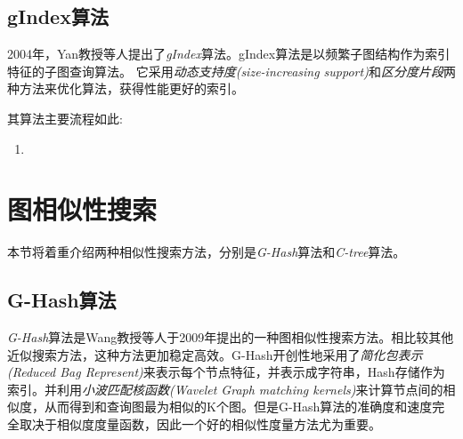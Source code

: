 \documentclass{XDBAthesis}
\begin{document}
\subsection{gIndex算法}
2004年，Yan教授等人提出了\emph{gIndex}算法\cite{gIndex}。gIndex算法是以频繁子图结构作为索引特征的子图查询算法。 它采用\emph{动态支持度(size-increasing support)}和\emph{区分度片段}两种方法来优化算法，获得性能更好的索引。

其算法主要流程如此:
\begin{enumerate}
    \item 
\end{enumerate}


\section{图相似性搜索}
本节将着重介绍两种相似性搜索方法，分别是\emph{G-Hash}算法\cite{ghash}和\emph{C-tree}算法\cite{C-Tree}。
\subsection{G-Hash算法}
\emph{G-Hash}算法是Wang教授等人于2009年提出的一种图相似性搜索方法。相比较其他近似搜索方法，这种方法更加稳定高效。G-Hash开创性地采用了\emph{简化包表示(Reduced Bag Represent)}来表示每个节点特征，并表示成字符串，Hash存储作为索引。并利用\emph{小波匹配核函数(Wavelet Graph matching kernels)}来计算节点间的相似度，从而得到和查询图最为相似的K个图。但是G-Hash算法的准确度和速度完全取决于相似度度量函数，因此一个好的相似性度量方法尤为重要。
\end{document}
